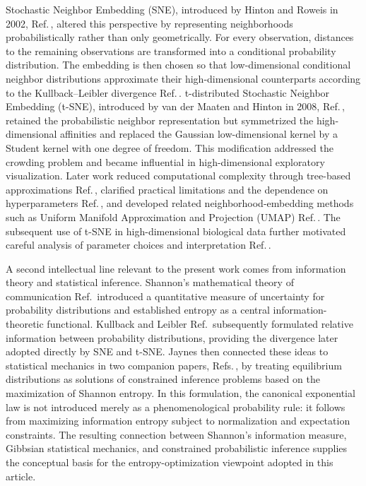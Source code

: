 \documentclass[11pt,a4paper]{article}
\theoremstyle{definition}
\theoremstyle{plain}
\begin{document}
Stochastic Neighbor Embedding (SNE), introduced by Hinton and Roweis in 2002, Ref.\,\cite{hinton2002sne}, altered this perspective by representing neighborhoods probabilistically rather than only geometrically. For every observation, distances to the remaining observations are transformed into a conditional probability distribution. The embedding is then chosen so that low-dimensional conditional neighbor distributions approximate their high-dimensional counterparts according to the Kullback--Leibler divergence Ref.\,\cite{kullback1951}. t-distributed Stochastic Neighbor Embedding (t-SNE), introduced by van der Maaten and Hinton in 2008, Ref.\,\cite{vandermaaten2008tsne}, retained the probabilistic neighbor representation but symmetrized the high-dimensional affinities and replaced the Gaussian low-dimensional kernel by a Student kernel with one degree of freedom. This modification addressed the crowding problem and became influential in high-dimensional exploratory visualization. Later work reduced computational complexity through tree-based approximations Ref.\,\cite{vandermaaten2014}, clarified practical limitations and the dependence on hyperparameters Ref.\,\cite{wattenberg2016}, and developed related neighborhood-embedding methods such as Uniform Manifold Approximation and Projection (UMAP) Ref.\,\cite{mcinnes2018umap}. The subsequent use of t-SNE in high-dimensional biological data further motivated careful analysis of parameter choices and interpretation Ref.\,\cite{kobak2019}.

A second intellectual line relevant to the present work comes from information theory and statistical inference. Shannon's mathematical theory of communication Ref.\,\cite{shannon1948} introduced a quantitative measure of uncertainty for probability distributions and established entropy as a central information-theoretic functional. Kullback and Leibler Ref.\,\cite{kullback1951} subsequently formulated relative information between probability distributions, providing the divergence later adopted directly by SNE and t-SNE. Jaynes then connected these ideas to statistical mechanics in two companion papers, Refs.\,\cite{jaynes1957,jaynes1957ii}, by treating equilibrium distributions as solutions of constrained inference problems based on the maximization of Shannon entropy. In this formulation, the canonical exponential law is not introduced merely as a phenomenological probability rule: it follows from maximizing information entropy subject to normalization and expectation constraints. The resulting connection between Shannon's information measure, Gibbsian statistical mechanics, and constrained probabilistic inference supplies the conceptual basis for the entropy-optimization viewpoint adopted in this article.
\end{document}
